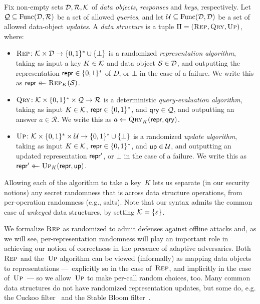 Fix non-empty sets $\mathcal{D}, \mathcal{R}, \mathcal{K}$ of \emph{data objects}, \emph{responses} and \emph{keys}, respectively.  Let $\mathcal{Q}\subseteq \mathrm{Func}(\mathcal{D},\mathcal{R})$ be a set of allowed \emph{queries}, and let
$\mathcal{U} \subseteq \mathrm{Func}(\mathcal{D},\mathcal{D})$ be a set of allowed data-object \emph{updates}. 
A {\em data structure} is a tuple $\Pi = (\textsc{Rep},\textsc{Qry},\textsc{Up})$, where:

\begin{itemize}
  \item $\textsc{Rep}\colon \mathcal{K} \times \mathcal{D} \to \{0,1\}^* \cup \{\bot\}$ is a randomized {\em representation algorithm}, taking as input a key $K \in \mathcal{K}$ and data object $\mathcal{S} \in \mathcal{D}$, and outputting the representation $\mathsf{repr} \in \{0,1\}^*$ of $D$, or $\bot$ in the case of a failure. We write this as $\mathsf{repr} \mathrel{\leftarrow\mkern-14mu\leftarrow} \textsc{Rep}_K(\mathcal{S})$.
%
  \item $\textsc{Qry}\colon \mathcal{K} \times \{0,1\}^* \times \mathcal{Q} \to \mathcal{R}$ is a deterministic {\em query-evaluation algorithm}, taking as input $K \in \mathcal{K}$, $\mathsf{repr} \in \{0,1\}^*$, and $\mathsf{qry} \in \mathcal{Q}$, and outputting an answer $a \in \mathcal{R}$. We write this as $a \gets \textsc{Qry}_K(\mathsf{repr},\mathsf{qry})$.
%
  \item $\textsc{Up}\colon \mathcal{K} \times \{0,1\}^* \times \mathcal{U} \to \{0,1\}^* \cup \{\bot\}$ is a randomized {\em update algorithm}, taking as input $K \in \mathcal{K}$, $\mathsf{repr} \in \{0,1\}^*$, and $\mathsf{up} \in \mathcal{U}$, and outputting an updated representation $\mathsf{repr}'$, or $\bot$ in the case of a failure. We write this as $\mathsf{repr}' \mathrel{\leftarrow\mkern-14mu\leftarrow} \textsc{Up}_K(\mathsf{repr},\mathsf{up})$.
\end{itemize}

Allowing each of the algorithm to take a key~$K$ lets us separate (in our security notions) any secret randomness that is across data structure operations, from per-operation randomness (e.g., salts).  Note that our syntax admits the common case of \emph{unkeyed} data structures, by setting $\mathcal{K}=\{\varepsilon\}$.  

We formalize $\textsc{Rep}$ as randomized to admit defenses against offline attacks and, as we will see, per-representation randomness will play an important role in achieving our notion of correctness in the presence of adaptive adversaries.  Both~$\textsc{Rep}$ and the~$\textsc{Up}$ algorithm can be viewed (informally) as mapping data objects to representations ---~explicitly so in the case of~$\textsc{Rep}$, and implicitly in the case of~$\textsc{Up}$~--- so we allow~$\textsc{Up}$ to make per-call random choices, too.  Many common data structures do not have randomized representation updates, but some do, e.g. the Cuckoo filter~\cite{xxx} and the Stable Bloom filter~\cite{xxx}.

